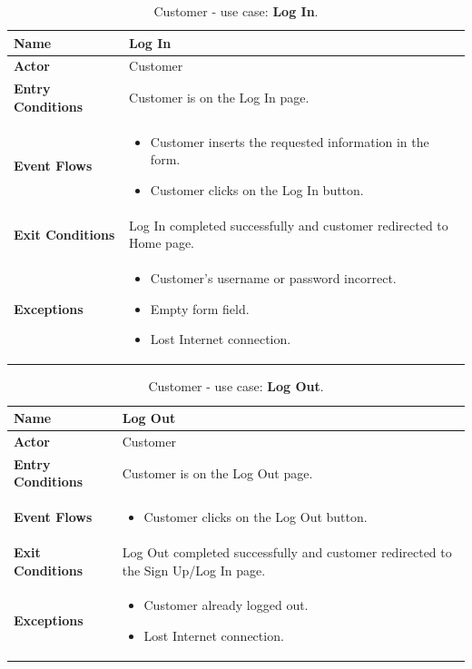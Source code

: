 \begin{table}[h!]
\centering
\begin{tabular}{| m{} | m{} |} 
	\hline
	\textbf{Name} & Log In \\ 
	\hline
	\textbf{Actor} & Customer \\ 
	\hline
	\textbf{Entry Conditions} & Customer is on the Log In page. \\ 
	\hline
	\textbf{Event Flows} &
	\begin{itemize}
	\item Customer inserts the requested information in the form.
	\item Customer clicks on the Log In button.
	\end{itemize} \\ 
	\hline
	\textbf{Exit Conditions} & Log In completed successfully and customer redirected to Home page. \\ 
	\hline
	\textbf{Exceptions} &
	\begin{itemize}
	\item Customer's username or password incorrect.
	\item Empty form field.
	\item Lost Internet connection.
	\end{itemize} \\ 
	\hline
\end{tabular}
\caption{Customer - use case: \textbf{Log In}.}
\label{tableLogIn}
\end{table}

\begin{table}[h!]
\centering
\begin{tabular}{| m{} | m{} |} 
	\hline
	\textbf{Name} & Log Out \\ 
	\hline
	\textbf{Actor} & Customer \\ 
	\hline
	\textbf{Entry Conditions} & Customer is on the Log Out page. \\ 
	\hline
	\textbf{Event Flows} &
	\begin{itemize}
	\item Customer clicks on the Log Out button.
	\end{itemize} \\ 
	\hline
	\textbf{Exit Conditions} & Log Out completed successfully and customer redirected to the Sign Up/Log In page. \\ 
	\hline
	\textbf{Exceptions} &
	\begin{itemize}
	\item Customer already logged out.
	\item Lost Internet connection.
	\end{itemize} \\ 
	\hline
\end{tabular}
\caption{Customer - use case: \textbf{Log Out}.}
\label{tableLogIn}
\end{table}

